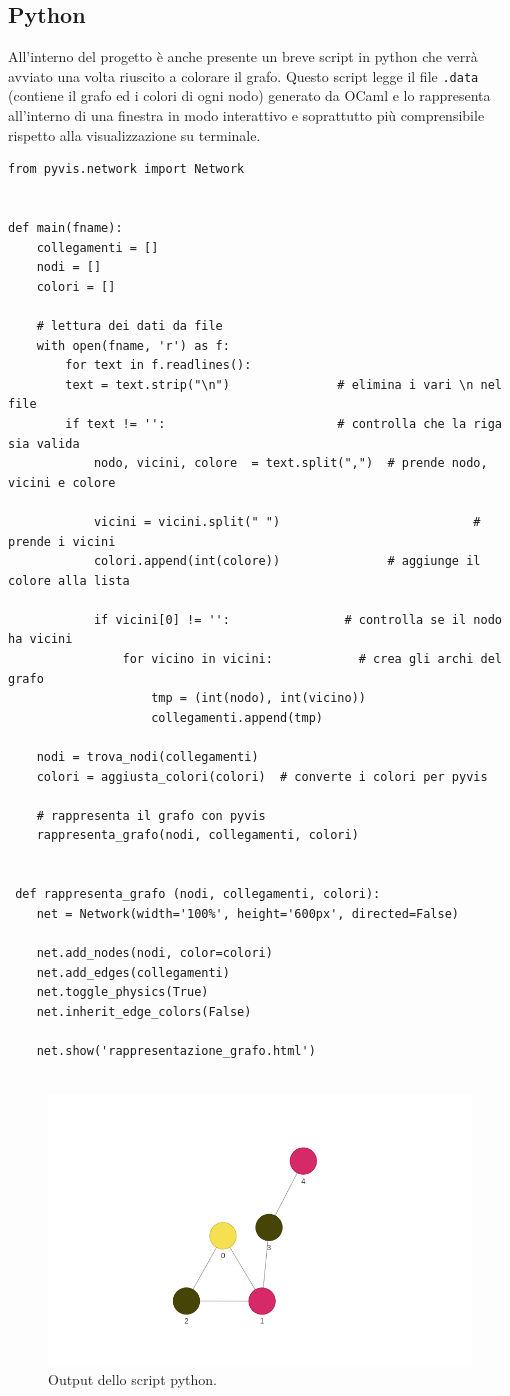 \subsection{Python}

All'interno del progetto è anche presente un breve script in python che verrà avviato una volta riuscito a colorare il grafo. Questo script legge il file \lstinline[style=cmd]|.data| (contiene il grafo ed i colori di ogni nodo) generato da OCaml e lo rappresenta all'interno di una finestra in modo interattivo e soprattutto più comprensibile rispetto alla visualizzazione su terminale.
\begin{lstlisting}[style=python, caption={Alcune funzioni dello script python}]
from pyvis.network import Network


def main(fname):
	collegamenti = []
	nodi = []
	colori = []

	# lettura dei dati da file
	with open(fname, 'r') as f:
		for text in f.readlines():
		text = text.strip("\n")               # elimina i vari \n nel file
		if text != '':                        # controlla che la riga sia valida
			nodo, vicini, colore  = text.split(",")  # prende nodo, vicini e colore

			vicini = vicini.split(" ")  				 	 	 # prende i vicini
			colori.append(int(colore))               # aggiunge il colore alla lista

			if vicini[0] != '':                # controlla se il nodo ha vicini
				for vicino in vicini:            # crea gli archi del grafo
					tmp = (int(nodo), int(vicino))
					collegamenti.append(tmp)    

	nodi = trova_nodi(collegamenti) 
	colori = aggiusta_colori(colori)  # converte i colori per pyvis
	
	# rappresenta il grafo con pyvis
	rappresenta_grafo(nodi, collegamenti, colori) 
 
 
 def rappresenta_grafo (nodi, collegamenti, colori):
	net = Network(width='100%', height='600px', directed=False)
 
 	net.add_nodes(nodi, color=colori)
 	net.add_edges(collegamenti)
 	net.toggle_physics(True)
 	net.inherit_edge_colors(False)
 
 	net.show('rappresentazione_grafo.html')
   		
\end{lstlisting}

\begin{figure}[H]
	\centering
	\includegraphics[width=.7\textwidth]{img/grafocoloratopy.png}
	\caption{Output dello script python.}
\end{figure}
